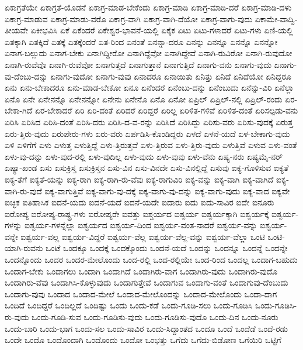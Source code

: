 {ಏಕಾಗ್ರತೆಯೇ
ಏಕಾಗ್ರತೆ-ಯೊಡನೆ
ಏಕಾಗ್ರ-ಮಾಡ-ಬೇಕೆಂದು
ಏಕಾಗ್ರ-ಮಾಡಿ
ಏಕಾಗ್ರ-ಮಾಡಿ-ದರೆ
ಏಕಾಗ್ರ-ಮಾಡಿ-ದಳು
ಏಕಾಗ್ರ-ಮಾಡುವ
ಏಕಾಗ್ರ-ಮಾಡು-ವರೊ
ಏಕಾಗ್ರ-ವಾಗಿ
ಏಕಾಗ್ರ-ವಾಗಿ-ದೆಯೋ
ಏಕಾಗ್ರ-ವಾಗು-ವುದು
ಏಕಾಮೇ-ವಾದ್ವಿ-ತೀಯವೇ
ಏಕೀಭವಿಸಿ
ಏಕೆ
ಏಕೆಂದರೆ
ಏಕೇಶ್ವರ-ಭಾವನೆ-ಯಲ್ಲಿ
ಏಕೈಕ
ಏಟು
ಏಟು-ಗಳಾದರೆ
ಏಟು-ಗಳು
ಏಣಿ-ಯಲ್ಲಿ
ಏತಕ್ಕಾಗಿ
ಏತಕ್ಕಿದೆ
ಏತಕ್ಕೆ
ಏತಕ್ಕೆಂದರೆ
ಏತ-ರಿಂದ
ಏನಂತೆ
ಏನನ್ನಾ-ದರೂ
ಏನನ್ನು
ಏನನ್ನೂ
ಏನನ್ನೊ
ಏನನ್ನೋ
ಏನಾಗ-ಬಲ್ಲುದು
ಏನಾಗ-ಬೇಕು
ಏನಾಗಿದ್ದೀರೋ
ಏನಾಗಿದ್ದೆವೋ
ಏನಾಗಿದ್ದೇವೆ
ಏನಾಗಿ-ರುವಿರೋ
ಏನಾಗಿ-ರುವುದೋ
ಏನಾಗಿ-ರುವೆವೊ
ಏನಾಗಿ-ರುವೆವೋ
ಏನಾಗುತ್ತದೆ
ಏನಾಗುತ್ತಾನೆ
ಏನಾಗುತ್ತಿದೆ
ಏನಾಗು-ವನು
ಏನಾಗು-ವುದು
ಏನಾಗು-ವು-ದೆಂಬು-ದನ್ನು
ಏನಾಗು-ವುದೋ
ಏನಾಗು-ವುವು
ಏನಾದರೂ
ಏನಾಯಿತು
ಏನಿತ್ತು
ಏನಿದೆ
ಏನಿದೆಯೋ
ಏನಿದ್ದರೂ
ಏನು
ಏನು-ಬೇಕಾದರೂ
ಏನು-ಮಾಡ-ಬೇಕೋ
ಏನೂ
ಏನೆಂದರೆ
ಏನೆಂಬು-ದನ್ನು
ಏನೆಂಬುದು
ಏನೆನ್ನು-ವಿರಿ
ಏನೆಲ್ಲಾ
ಏನೊ
ಏನೇ
ಏನೇನನ್ನೊ
ಏನೇನನ್ನೋ
ಏನೇನು
ಏನೇನೊ
ಏನೊ
ಏನೋ
ಏಪ್ರಿಲ್
ಏಪ್ರಿಲ್-ನಲ್ಲಿ
ಏಪ್ರಿಲ್-ರಂದು
ಏರ-ಬೇಕಾ-ಗಿದೆ
ಏರ-ಬೇಕಾದರೆ
ಏರಿ
ಏರಿ-ದಂತೆ
ಏರಿದರೆ
ಏರಿದ್ದರೆ
ಏರಿಲ್ಲ
ಏರಿಳಿತ-ಗಳಿವೆ
ಏರಿಳಿತ-ದಂತೆ
ಏರಿಸಲ್ಪಡು-ವನು
ಏರಿಸಿ
ಏರಿಸಿದ
ಏರಿಸಿ-ದಂತೆ
ಏರಿಸಿ-ದರು
ಏರಿಸಿ-ದ-ವ-ರನ್ನು
ಏರಿಸಿದೆ
ಏರಿಸಿದ್ದು
ಏರಿಸು-ವರು
ಏರಿಸು-ವುದಕ್ಕೆ
ಏರುತ್ತ
ಏರು-ತ್ತಿರು-ವುದು
ಏರುಪೇರು-ಗಳು
ಏರು-ವರು
ಏರ್ಪಡಿಸಿ-ಕೊಂಡಿದ್ದರು
ಏಳದೆ
ಏಳನೆ-ಯದೆ
ಏಳ-ಬೇಕಾಗು-ವುದು
ಏಳಿ
ಏಳಿಗೆಗೆ
ಏಳು
ಏಳುತ್ತ
ಏಳುತ್ತಿದ್ದೆ
ಏಳು-ತ್ತಿರುತ್ತವೆ
ಏಳು-ತ್ತಿರುವ
ಏಳು-ತ್ತಿರು-ವುದು
ಏಳುತ್ತಿವೆ
ಏಳುವ
ಏಳು-ವಂತೆ
ಏಳು-ವು-ದನ್ನು
ಏಳು-ವುದ-ರಲ್ಲಿ
ಏಳು-ವುದಿಲ್ಲ
ಏಳು-ವುದು
ಏಳು-ವುವು
ಏಳು-ವೆನು
ಏಷ್ಯ-ನರು
ಏಷ್ಯಮೈ-ನರ್
ಏಷ್ಯಾ-ಖಂಡ
ಏಸು
ಏಸುಕ್ರಿಸ್ತ
ಏಸುಕ್ರಿಸ್ತನ
ಏಸು-ವಿನ
ಏಸು-ವಿನದೇ
ಏಸು-ವಿನಲ್ಲಿದ್ದೆ
ಏಸುವು
ಐಕ್ಯ-ಗೊಳಿಸುವ
ಐಕ್ಯತೆ
ಐಕ್ಯ-ತೆಗೆ
ಐಕ್ಯತೆ-ಯನ್ನು
ಐಕ್ಯ-ರಾಗಿ
ಐಕ್ಯ-ರಾಗಿ-ರು-ವೆವು
ಐಕ್ಯ-ರಾಗುವಿರಿ
ಐಕ್ಯ-ವನ್ನು
ಐಕ್ಯ-ವಾಗಿ
ಐಕ್ಯ-ವಾಗಿದೆ
ಐಕ್ಯ-ವಾಗಿ-ರು-ವುದೆ
ಐಕ್ಯ-ವಾಗುತ್ತಿವೆ
ಐಕ್ಯ-ವಾಗು-ವು-ದಕ್ಕೆ
ಐಕ್ಯ-ವಾಗು-ವು-ದನ್ನು
ಐಕ್ಯ-ವಾಗು-ವುದು
ಐಕ್ಯ-ವಾದ
ಐಕ್ಯವೇ
ಐಚ್ಛಿಕ
ಐತಿಹಾಸಿಕ
ಐದನೆ-ಯದು
ಐದನೆ-ಯದೆ
ಐದನೆ-ಯದೇ
ಐದಾರು
ಐದು
ಐದು-ಸಾವಿರ
ಐದೇ
ಐನೂರು
ಐರೋಪ್ಯ
ಐರೋಪ್ಯ-ರಾಷ್ಟ್ರ-ಗಳು
ಐರೋಪ್ಯರೇ
ಐವತ್ತು
ಐಶ್ಚರ್ಯದ
ಐಶ್ವರ್ಯ
ಐಶ್ವರ್ಯಕ್ಕಾಗಿ
ಐಶ್ವರ್ಯಕ್ಕೆ
ಐಶ್ವರ್ಯ-ಗಳನ್ನು
ಐಶ್ವರ್ಯ-ಗಳನ್ನೆಲ್ಲಾ
ಐಶ್ವರ್ಯದ
ಐಶ್ವರ್ಯ-ದಿಂದ
ಐಶ್ವರ್ಯ-ವಂತ-ನಾದರೆ
ಐಶ್ವರ್ಯ-ವನ್ನು
ಐಶ್ವರ್ಯ-ವನ್ನೇ
ಐಶ್ವರ್ಯ-ವಲ್ಲ
ಐಶ್ವರ್ಯ-ವಿದ್ದರೆ
ಐಶ್ವರ್ಯ-ವೆಲ್ಲ
ಐಶ್ವರ್ಯ-ವೆಲ್ಲ-ವನ್ನು
ಐಶ್ವರ್ಯ-ವೆಲ್ಲಾ
ಒಂಟಿ
ಒಂಟಿ-ಯಾಗಿ-ರುವನು
ಒಂಟೆ
ಒಂದಕ್ಕೂ
ಒಂದಕ್ಕೆ
ಒಂದಕ್ಕೊಂದು
ಒಂದನೆ-ಯದೆ
ಒಂದನ್ನು
ಒಂದನ್ನೂ
ಒಂದನ್ನೆ
ಒಂದನ್ನೇ
ಒಂದನ್ನೊಂದು
ಒಂದರ
ಒಂದರ-ಮೇಲೊಂದು
ಒಂದ-ರಲ್ಲಿ
ಒಂದ-ರಲ್ಲಿಯೇ
ಒಂದ-ರಿಂದ
ಒಂದಲ್ಲ
ಒಂದಾಗ-ಬಹುದು
ಒಂದಾಗ-ಬೇಕು
ಒಂದಾಗಲು
ಒಂದಾಗಿ
ಒಂದಾಗಿದೆ
ಒಂದಾಗಿರು-ವಾಗ
ಒಂದಾಗಿರು-ವುದು
ಒಂದಾಗಿರು-ವುದೊ
ಒಂದಾಗಿರು-ವೆವು
ಒಂದಾಗಿಸಿ-ಕೊಳ್ಳುವುದು
ಒಂದಾಗುತ್ತೇವೆ
ಒಂದಾಗುವ
ಒಂದಾಗು-ವಂತೆ
ಒಂದಾಗುವು-ದೆಂಬುದು
ಒಂದಾಗು-ವುವು
ಒಂದಾದ
ಒಂದಾದ-ಮೇಲೆ
ಒಂದಾದ-ಮೇಲೊಂದನ್ನು
ಒಂದಾದ-ಮೇಲೊಂದು
ಒಂದಾ-ದಾಗ
ಒಂದಿದೆ
ಒಂದಿದ್ದರೆ
ಒಂದಿಲ್ಲದೆ
ಒಂದಿಷ್ಟು
ಒಂದು
ಒಂದು-ಕಡೆ
ಒಂದು-ಗೂಡಿ-ಸಲು
ಒಂದು-ಗೂಡಿಸಿ
ಒಂದು-ಗೂಡಿಸಿ-ರು-ವುದು
ಒಂದು-ಗೂಡಿ-ಸುವ
ಒಂದು-ಗೂಡಿಸು-ವುದು
ಒಂದು-ಗೂಡಿಸು-ವುದೊ
ಒಂದು-ದಿನ
ಒಂದು-ನೂರು
ಒಂದು-ಬಾರಿ
ಒಂದು-ಭಾಗ
ಒಂದು-ಸಲ
ಒಂದು-ಸಾವಿರ
ಒಂದು-ಸಿದ್ದಾಂತದ
ಒಂದೂ
ಒಂದೆ
ಒಂದೆಡೆ
ಒಂದೆ-ರಡು
ಒಂದೇ
ಒಂದೊ
ಒಂದೊಂದಾಗಿ
ಒಂದೊಂದು
ಒಂದೋ
ಒಂಭತ್ತು
ಒಗೆದು
ಒಗೆದು-ಬಿಡೋಣ
ಒಗೆಯಿರಿ
ಒಟ್ಟಿಗೆ
}
